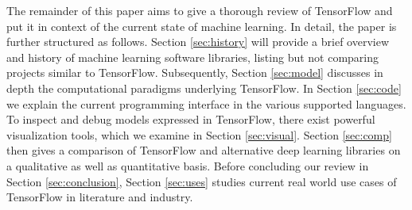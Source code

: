 The remainder of this paper aims to give a thorough review of TensorFlow and put
it in context of the current state of machine learning. In detail, the paper is
further structured as follows. Section \ref{sec:history} will provide a brief
overview and history of machine learning software libraries, listing but not
comparing projects similar to TensorFlow. Subsequently, Section \ref{sec:model}
discusses in depth the computational paradigms underlying TensorFlow. In Section
\ref{sec:code} we explain the current programming interface in the various
supported languages. To inspect and debug models expressed in TensorFlow, there
exist powerful visualization tools, which we examine in Section
\ref{sec:visual}. Section \ref{sec:comp} then gives a comparison of TensorFlow
and alternative deep learning libraries on a qualitative as well as quantitative
basis. Before concluding our review in Section \ref{sec:conclusion}, Section
\ref{sec:uses} studies current real world use cases of TensorFlow in literature
and industry.

